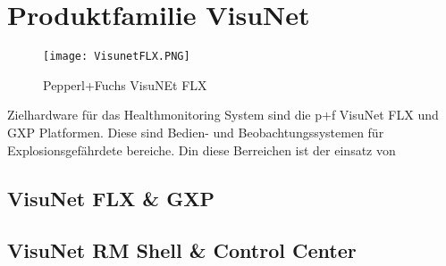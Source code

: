 \section{Produktfamilie VisuNet}
\begin{wrapfigure}{r}{0.2\textwidth}
    \vspace{-1.2cm}
    \begin{center}
      \texttt{[image: VisunetFLX.PNG]}
    \end{center}
    \vspace{-0.5cm}
    \caption{Pepperl+Fuchs VisuNEt FLX}
    \label{fig:VisuNetFLX}
    \vspace{-0.5cm}
  \end{wrapfigure}
Zielhardware für das Healthmonitoring System sind die \ac{p+f} VisuNet FLX und GXP Platformen. Diese sind Bedien- und Beobachtungssystemen für Explosionsgefährdete bereiche. Din diese Berreichen ist der einsatz von 

\subsection{VisuNet FLX \& GXP}

\subsection{VisuNet RM Shell \& Control Center}